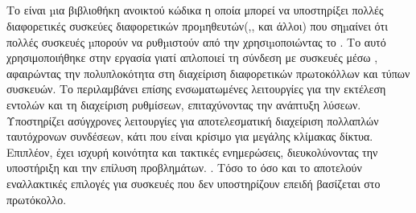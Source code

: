 \subsection{}
Το  είναι µια βιβλιοθήκη  ανοικτού κώδικα η οποία μπορεί να υποστηρίξει πολλές 
διαφορετικές συσκεύες διαφορετικών προµηθευτών(,, και άλλοι) που σηµαίνει ότι πολλές συσκευές µπορούν 
να ρυθµιστούν από την  χρησιµοποιώντας το . 
Το  αυτό χρησιμοποιήθηκε στην εργασία γιατί απλοποιεί τη σύνδεση με συσκευές μέσω , αφαιρώντας την πολυπλοκότητα στη διαχείριση διαφορετικών πρωτοκόλλων και 
τύπων συσκευών.
Το  περιλαμβάνει επίσης ενσωματωμένες λειτουργίες για την εκτέλεση εντολών και τη διαχείριση ρυθμίσεων, επιταχύνοντας την ανάπτυξη λύσεων.
Υποστηρίζει ασύγχρονες λειτουργίες για αποτελεσματική διαχείριση πολλαπλών ταυτόχρονων συνδέσεων, κάτι που είναι κρίσιμο για μεγάλης κλίμακας δίκτυα. Επιπλέον, έχει ισχυρή 
κοινότητα και τακτικές ενημερώσεις, διευκολύνοντας την υποστήριξη και την επίλυση προβλημάτων.
. Τόσο το  όσο και το  αποτελούν εναλλακτικές επιλογές για συσκευές που δεν υποστηρίζουν  επειδή βασίζεται στο  πρωτόκολλο.


